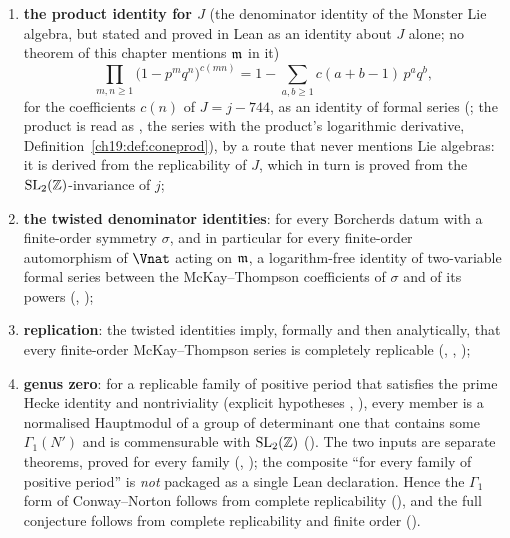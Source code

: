 \begin{enumerate}[label=(\Roman*)]
\item \textbf{the product identity for $J$} (the denominator identity of the Monster Lie algebra, but stated and
  proved in Lean as an identity about $J$ alone; no theorem of this chapter mentions $\mathfrak{m}$ in it)
  \begin{equation}\label{ch19:eq:knz-intro}
    \prod_{m,n\ge1}\bigl(1-p^mq^n\bigr)^{c(mn)}=1-\sum_{a,b\ge1}c(a+b-1)\,p^aq^b ,
  \end{equation}
  for the coefficients $c(n)$ of $J=j-744$, as an identity of formal series (; the product is read as
  , the series with the product's logarithmic derivative, Definition~\ref{ch19:def:coneprod}), by a route that
  never mentions Lie algebras: it is derived from the replicability of $J$, which in turn is proved from the
  $\mathrm{SL}_2(\mathbb{Z})$-invariance of $j$;
\item \textbf{the twisted denominator identities}: for every Borcherds datum with a finite-order symmetry $\sigma$,
  and in particular for every finite-order automorphism of $\Vnat$ acting on $\mathfrak{m}$, a logarithm-free identity
  of two-variable formal series between the McKay--Thompson coefficients of $\sigma$ and of its powers
  (, );
\item \textbf{replication}: the twisted identities imply, formally and then analytically, that every finite-order
  McKay--Thompson series is completely replicable (, ,
  );
\item \textbf{genus zero}: for a replicable family of positive period that satisfies the prime Hecke identity and
  nontriviality (explicit hypotheses , ), every member is a normalised Hauptmodul of a group of
  determinant one that contains some $\Gamma_1(N')$ and is commensurable with $\mathrm{SL}_2(\mathbb{Z})$
  ().  The two inputs are separate theorems, proved for every family
  (, ); the composite
  ``for every family of positive period'' is \emph{not} packaged as a single Lean declaration.  Hence the $\Gamma_1$ form of
  Conway--Norton follows from complete replicability (), and the full
  conjecture follows from complete replicability and finite order ().
\end{enumerate}
